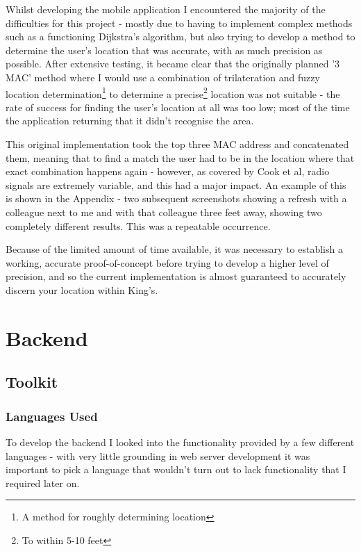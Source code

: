 \documentclass[11pt]{informatics-report}
\begin{document}
Whilst developing the mobile application I encountered the majority of the difficulties for this project - mostly due to having to implement complex methods such as a functioning Dijkstra's algorithm, but also trying to develop a method to determine the user's location that was accurate, with as much precision as possible. After extensive testing, it became clear that the originally planned '3 MAC' method where I would use a combination of trilateration and fuzzy location determination\footnote{A method for roughly determining location} to determine a precise\footnote{To within 5-10 feet} location was not suitable - the rate of success for finding the user's location at all was too low; most of the time the application returning that it didn't recognise the area.

This original implementation took the top three MAC address and concatenated them, meaning that to find a match the user had to be in the location where that exact combination happens again - however, as covered by Cook et al, radio signals are extremely variable\cite{cook2005indoor}, and this had a major impact. An example of this is shown in the Appendix - two subsequent screenshots showing a refresh with a colleague next to me and with that colleague three feet away, showing two completely different results. This was a repeatable occurrence. 

Because of the limited amount of time available, it was necessary to establish a working, accurate proof-of-concept before trying to develop a higher level of precision, and so the current implementation is almost guaranteed to accurately discern your location within King's.

\section{Backend}

\subsection{Toolkit}

\subsubsection{Languages Used}

To develop the backend I looked into the functionality provided by a few different languages - with very little grounding in web server development it was important to pick a language that wouldn't turn out to lack functionality that I required later on.
\end{document}
